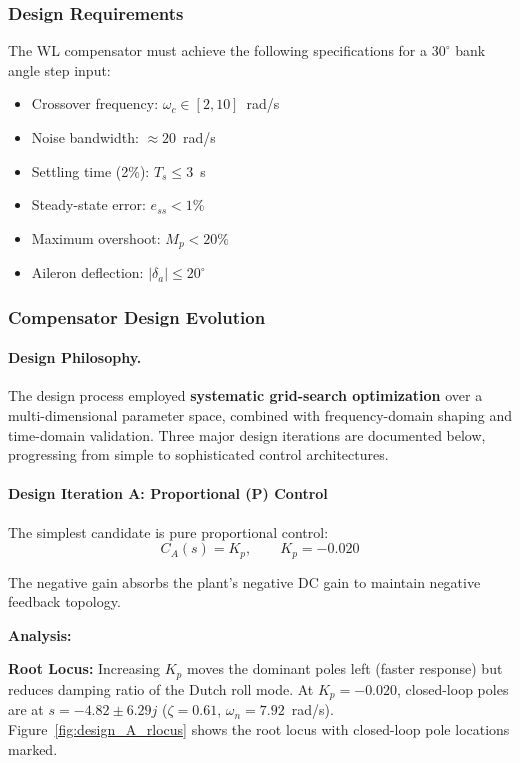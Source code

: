 \subsubsection{Design Requirements}

The WL compensator must achieve the following specifications for a $30^\circ$ bank angle step input:
\begin{itemize}
\item Crossover frequency: $\omega_c \in [2,10]$~rad/s
\item Noise bandwidth: $\approx 20$~rad/s
\item Settling time (2\%): $T_s \le 3$~s
\item Steady-state error: $e_{ss} < 1\%$
\item Maximum overshoot: $M_p < 20\%$
\item Aileron deflection: $|\delta_a| \le 20^\circ$
\end{itemize}

\subsubsection{Compensator Design Evolution}

\paragraph{Design Philosophy.}
The design process employed \textbf{systematic grid-search optimization} over a multi-dimensional parameter space, combined with frequency-domain shaping and time-domain validation. Three major design iterations are documented below, progressing from simple to sophisticated control architectures.

\paragraph{Design Iteration A: Proportional (P) Control}

The simplest candidate is pure proportional control:
\begin{equation}
C_A(s) = K_p, \qquad K_p = -0.020
\label{eq:design_A}
\end{equation}

The negative gain absorbs the plant's negative DC gain to maintain negative feedback topology.

\textbf{Analysis:}

\textbf{Root Locus:} Increasing $K_p$ moves the dominant poles left (faster response) but reduces damping ratio of the Dutch roll mode. At $K_p=-0.020$, closed-loop poles are at $s = -4.82 \pm 6.29j$ ($\zeta=0.61$, $\omega_n=7.92$~rad/s). Figure~\ref{fig:design_A_rlocus} shows the root locus with closed-loop pole locations marked.

